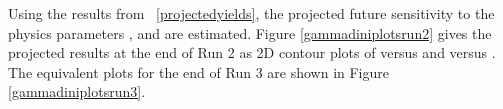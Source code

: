 \begin{table}
\caption{Yields and projected yields for different data-taking periods of the LHC. The entries in bold are projected yields, whereas the other entries refer to data used in this thesis. Projected results are justified in the text, with information taken from Ref.~\cite{CERN-LHCC-2014-016}.}
\label{projectedyields}
\end{table}


Using the results from \tab~\ref{projectedyields}, the projected future sensitivity to the physics parameters \rb, \deltab and \Pgamma are estimated. Figure \ref{gammadiniplotsrun2} gives the projected results at the end of Run 2 as 2D contour plots of \rb versus \Pgamma and \deltab versus \Pgamma. The equivalent plots for the end of Run 3 are shown in Figure \ref{gammadiniplotsrun3}. 


